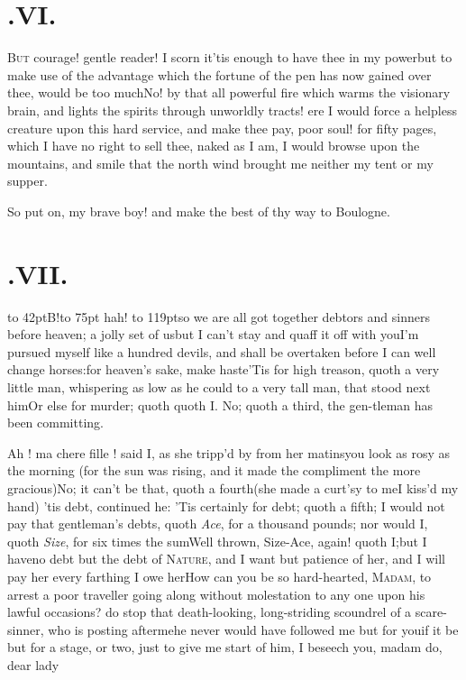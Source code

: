 \documentclass{article}
\begin{document}
\section{.\enspace VI.}

\lettrine{\Tsk B}{ut} courage! gentle
reader!\break
\tsh I scorn it\tsh ’tis enough\break
to have thee in my power\tsh but to make use of the advantage which the fortune of
the pen has now gained over thee, would be too much\tsh No\tsh !\break
by that all powerful fire which warms the visionary brain, and lights the spirits through
unworldly tracts! ere I would force a helpless creature upon this hard service, and
make thee pay, poor soul! for fifty pages, which I have no right to sell thee,\tsk
naked as I am, I would browse upon the mountains, and smile that the north wind
brought me neither my tent or my supper.

\tsh So put on, my brave boy! and make the best of thy way to
Boulogne.

\vfill{}\eject
\section{.\enspace VII.}

\lettrine{\hbox to 42pt{\Tsk B}}{}!\hbox to 75pt {\tsk hah!}\break
\hbox to 119pt{\tsk so we are all got together}\break
\tsh debtors and sinners before heaven;\break
a jolly
set of us\tsk but I can’t stay and quaff it off with
you\tsk I’m pursued myself like a hundred devils, and shall be
overtaken before I can well change horses:\tsh for heaven’s
sake, make haste\tsh ’Tis for high treason, quoth a very little
man, whispering as low as he could to a very tall man, that stood next
him\tsh Or else for murder; quoth\break
{}
quoth I. No; quoth a third, the gen-\break tleman has been committing\tsh\tsh.

Ah ! ma chere fille ! said I, as she\break
tripp’d by from her matins\tsk you look as rosy as the morning (for the sun was
rising, and it made the compliment the more gracious)\tsh No; it can’t be that,\break
quoth a fourth\tsh (she made a
curt’sy to me\tsk I kiss’d my hand) ’tis
debt, continued he: ’Tis certainly for debt; quoth a
fifth; I would not pay that gentleman’s debts, quoth
\textit{Ace}, for a thousand pounds; nor would I, quoth \textit{Size},
for six times the sum\tsk Well thrown, Size-Ace, again!
quoth I;\tsk but I have\break no debt but the debt of
\textsc{Nature}, and I want but patience of her, and I will
pay her every farthing I owe her\tsh\break How can you be so
hard-hearted, \textsc{Ma\-dam}, to arrest a poor traveller going along without
molestation to any one upon his lawful occasions? do stop that
death-looking, long-striding scoundrel of a scare-sinner, who is
posting after\break me\tsh he never would have followed me but
for you\tsh if it be but for a stage, or two, just to give
me start of him, I beseech you, madam\tsh\tsh\break
do, dear lady\tsh
\end{document}
